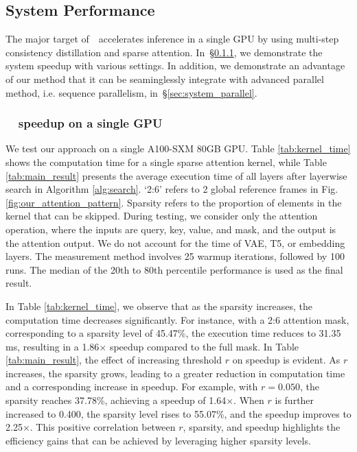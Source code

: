\subsection{System Performance}
\label{sec:system_performance}
The major target of~\methodname~accelerates inference in a single GPU by using multi-step consistency distillation and sparse attention. In~\S\ref{sec:system_kernel}, we demonstrate the system speedup with various settings. In addition, we demonstrate an advantage of our method that it can be seaminglessly integrate with advanced parallel method, i.e. sequence parallelism, in~\S\ref{sec:system_parallel}.


\subsubsection{~\methodname~speedup on a single GPU}
\label{sec:system_kernel}
We test our approach on a single A100-SXM 80GB GPU. Table \ref{tab:kernel_time} shows the computation time for a single sparse attention kernel, while Table \ref{tab:main_result} presents the average execution time of all layers after layerwise search in Algorithm \ref{alg:search}. `2:6' refers to 2 global reference frames in Fig.\ref{fig:our_attention_pattern}. Sparsity refers to the proportion of elements in the kernel that can be skipped. During testing, we consider only the attention operation, where the inputs are query, key, value, and mask, and the output is the attention output. We do not account for the time of VAE, T5, or embedding layers. The measurement method involves 25 warmup iterations, followed by 100 runs. The median of the 20th to 80th percentile performance is used as the final result.

In Table \ref{tab:kernel_time}, we observe that as the sparsity increases, the computation time decreases significantly. For instance, with a 2:6 attention mask, corresponding to a sparsity level of 45.47\%, the execution time reduces to 31.35 ms, resulting in a 1.86$\times$ speedup compared to the full mask. In Table \ref{tab:main_result}, the effect of increasing threshold $r$ on speedup is evident. As $r$ increases, the sparsity grows, leading to a greater reduction in computation time and a corresponding increase in speedup. For example, with $r=0.050$, the sparsity reaches 37.78\%, achieving a speedup of 1.64$\times$. When $r$ is further increased to 0.400, the sparsity level rises to 55.07\%, and the speedup improves to 2.25$\times$. This positive correlation between $r$, sparsity, and speedup highlights the efficiency gains that can be achieved by leveraging higher sparsity levels.

